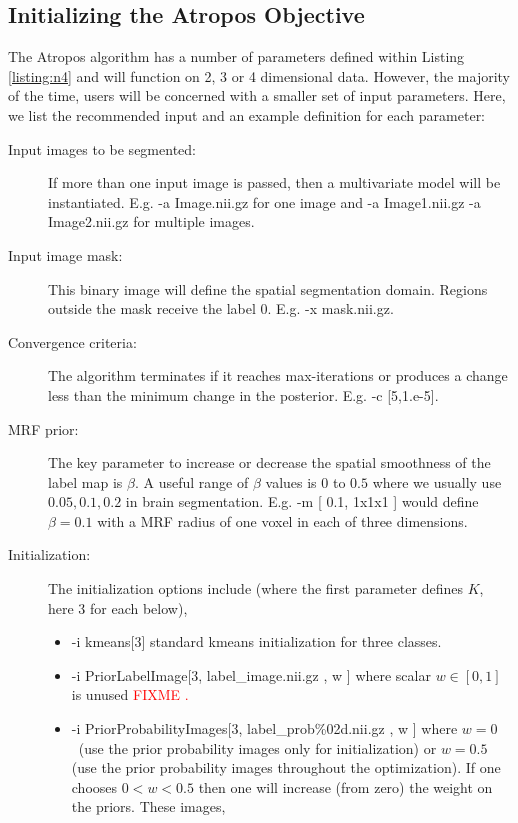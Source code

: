\documentclass[11pt,english]{article}
\begin{document}
{\subsection{Initializing the Atropos Objective}
The Atropos algorithm has a number of parameters defined within
Listing \ref{listing:n4} and will function on 2, 3 or 4 dimensional
data.  However, the majority of the time, users will be concerned with
a smaller set of input parameters.  Here, we list the recommended input and
an example definition for each parameter:
\begin{description}
\item[Input images to be segmented:] If more than
  one input image is passed, then a multivariate model will be
  instantiated.  E.g.  {\ttfamily -a Image.nii.gz} for one image and
  {\ttfamily -a Image1.nii.gz -a Image2.nii.gz} for multiple images.
\item[Input image mask:] This binary image
  will define the spatial segmentation domain.  Regions outside the
  mask receive the label $0$.  E.g.  {\ttfamily -x mask.nii.gz}. 
\item[Convergence criteria:] The algorithm terminates if it reaches max-iterations or
  produces a change less than the minimum change in the posterior.
  E.g. {\ttfamily -c [5,1.e-5]}. 
\item[MRF prior:] The key parameter to increase or decrease the
  spatial smoothness of the label map is $\beta$.  A useful range of
  $\beta$ values is $0$ to $0.5$ where we usually use $0.05, 0.1, 0.2$
  in brain segmentation.  E.g.  {\ttfamily -m [ 0.1, 1x1x1 ]} would
  define $\beta=0.1$ with a MRF radius of one voxel in each of three dimensions.
\item[Initialization:] The initialization options include (where the
  first parameter defines $K$, here 3 for each below),
\begin{itemize}
\item  {\ttfamily -i  kmeans[3]} standard kmeans initialization for
  three classes.
\item  {\ttfamily -i  PriorLabelImage[3, label\_image.nii.gz , w ]}
  where scalar $w \in [0,1]$ is unused \textcolor{red}{ FIXME .} 
\item  {\ttfamily -i  PriorProbabilityImages[3, label\_prob\%02d.nii.gz ,
    w ]} where $w=0$~(use the prior probability images only for
  initialization) or $w=0.5$ (use the prior probability images
  throughout the optimization).  If one chooses $0 < w < 0.5$ then one
  will increase (from zero) the weight on the priors.  These images,

\end{itemize}
\end{description}}
\end{document}
